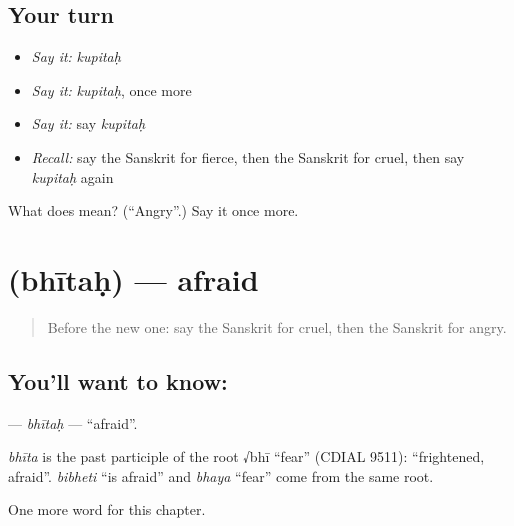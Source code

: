 \subsection*{Your turn}
\begin{itemize}
\raggedright
  \item \emph{Say it:} \emph{kupitaḥ}
  \item \emph{Say it:} \emph{kupitaḥ}, once more
  \item \emph{Say it:} say \emph{kupitaḥ}
  \item \emph{Recall:} say the Sanskrit for fierce, then the Sanskrit for cruel, then say \emph{kupitaḥ} again
\end{itemize}

\begin{tcolorbox}[breakable,colback=teal!4,colframe=teal!35!black,title={Before you move on}]
What does  mean? (\textquotedblleft{}Angry\textquotedblright{}.) Say it once more.
\end{tcolorbox}
\section[\texorpdfstring{\sk{भीतः} (bhītaḥ)}{भीतः (bhītaḥ)}]{ (bhītaḥ) — afraid}

\label{lesson:SA-C157-bhitah}



\begin{quote}
Before the new one: say the Sanskrit for cruel, then the Sanskrit for angry.
\end{quote}

\subsection*{You'll want to know: }
\textbf{} — \emph{bhītaḥ} — \textquotedblleft{}afraid\textquotedblright{}.

\begin{cousinweb}
\emph{bhīta} is the past participle of the root √bhī \textquotedblleft{}fear\textquotedblright{} (CDIAL 9511): \textquotedblleft{}frightened, afraid\textquotedblright{}. \emph{bibheti} \textquotedblleft{}is afraid\textquotedblright{} and \emph{bhaya} \textquotedblleft{}fear\textquotedblright{} come from the same root.
\end{cousinweb}

\begin{grammarlens}[title={What you've built}]
One more word for this chapter.
\end{grammarlens}

